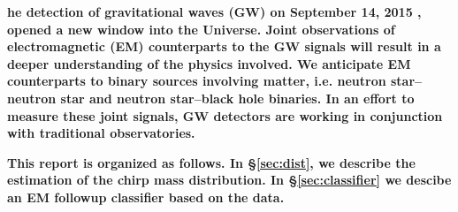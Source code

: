  {\bf he detection of gravitational waves (GW) on September 14, 2015 \parencite{2016PhRvL.116f1102A}, opened a new window into the Universe. Joint observations of electromagnetic (EM) counterparts to the GW signals will result in a deeper understanding of the physics involved. We anticipate EM counterparts to binary sources involving matter, i.e. neutron star--neutron star and neutron star--black hole binaries. In an effort to measure these joint signals, GW detectors are working in conjunction with traditional observatories.}

{\bf This report is organized as follows. In \S\ref{sec:dist}, we describe the estimation of the chirp mass distribution. In \S\ref{sec:classifier} we descibe an EM followup classifier based on the data.
}